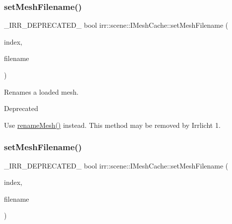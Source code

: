 \subsubsection{\texorpdfstring{set\+Mesh\+Filename()}{setMeshFilename()}\hspace{0.1cm}{\footnotesize\ttfamily [1/4]}}
{\footnotesize\ttfamily \+\_\+\+I\+R\+R\+\_\+\+D\+E\+P\+R\+E\+C\+A\+T\+E\+D\+\_\+ bool irr\+::scene\+::\+I\+Mesh\+Cache\+::set\+Mesh\+Filename (\begin{DoxyParamCaption}\item[{\hyperlink{namespaceirr_a0416a53257075833e7002efd0a18e804}{u32}}]{index,  }\item[{const \hyperlink{namespaceirr_1_1io_a6468281622ce3a1c46b72e19f32dded5}{io\+::path} \&}]{filename }\end{DoxyParamCaption})\hspace{0.3cm}{\ttfamily [inline]}}



Renames a loaded mesh. 

\begin{DoxyRefDesc}{Deprecated}
\item[\hyperlink{deprecated__deprecated000012}{Deprecated}]Use \hyperlink{classirr_1_1scene_1_1IMeshCache_a820743b703cdc4362a3dbe6664271bcb}{rename\+Mesh()} instead. This method may be removed by Irrlicht 1. \end{DoxyRefDesc}
\mbox{\label{classirr_1_1scene_1_1IMeshCache_a5b87031dbfdb70a59c00a1b892b74c3d}} 
\subsubsection{\texorpdfstring{set\+Mesh\+Filename()}{setMeshFilename()}\hspace{0.1cm}{\footnotesize\ttfamily [2/4]}}
{\footnotesize\ttfamily \+\_\+\+I\+R\+R\+\_\+\+D\+E\+P\+R\+E\+C\+A\+T\+E\+D\+\_\+ bool irr\+::scene\+::\+I\+Mesh\+Cache\+::set\+Mesh\+Filename (\begin{DoxyParamCaption}\item[{\hyperlink{namespaceirr_a0416a53257075833e7002efd0a18e804}{u32}}]{index,  }\item[{const \hyperlink{namespaceirr_1_1io_a6468281622ce3a1c46b72e19f32dded5}{io\+::path} \&}]{filename }\end{DoxyParamCaption})\hspace{0.3cm}{\ttfamily [inline]}}



